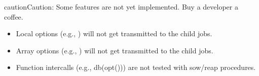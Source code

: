 \documentclass[letterpaper,10pt,english]{sphinxmanual}
\begin{document}
\begin{notice}{caution}{Caution:}
Some features are not yet implemented. Buy a developer a coffee.
\begin{itemize}
\item {} 
Local options (e.g., ) will not get transmitted to the child jobs.

\item {} 
Array options (e.g., ) will not get transmitted to the child jobs.

\item {} 
Function intercalls (e.g., db(opt())) are not tested with sow/reap procedures.

\end{itemize}
\end{notice}
\end{document}
